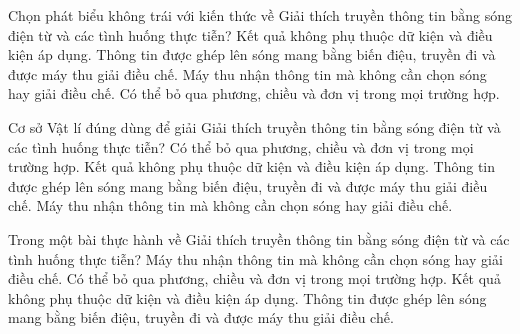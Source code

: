 \begin{ex}
Chọn phát biểu không trái với kiến thức về Giải thích truyền thông tin bằng sóng điện từ và các tình huống thực tiễn?
\choice
{Kết quả không phụ thuộc dữ kiện và điều kiện áp dụng.}
{\True Thông tin được ghép lên sóng mang bằng biến điệu, truyền đi và được máy thu giải điều chế.}
{Máy thu nhận thông tin mà không cần chọn sóng hay giải điều chế.}
{Có thể bỏ qua phương, chiều và đơn vị trong mọi trường hợp.}
\end{ex}

\begin{ex}
Cơ sở Vật lí đúng dùng để giải Giải thích truyền thông tin bằng sóng điện từ và các tình huống thực tiễn?
\choice
{Có thể bỏ qua phương, chiều và đơn vị trong mọi trường hợp.}
{Kết quả không phụ thuộc dữ kiện và điều kiện áp dụng.}
{\True Thông tin được ghép lên sóng mang bằng biến điệu, truyền đi và được máy thu giải điều chế.}
{Máy thu nhận thông tin mà không cần chọn sóng hay giải điều chế.}
\end{ex}

\begin{ex}
Trong một bài thực hành về Giải thích truyền thông tin bằng sóng điện từ và các tình huống thực tiễn?
\choice
{Máy thu nhận thông tin mà không cần chọn sóng hay giải điều chế.}
{Có thể bỏ qua phương, chiều và đơn vị trong mọi trường hợp.}
{Kết quả không phụ thuộc dữ kiện và điều kiện áp dụng.}
{\True Thông tin được ghép lên sóng mang bằng biến điệu, truyền đi và được máy thu giải điều chế.}
\end{ex}

